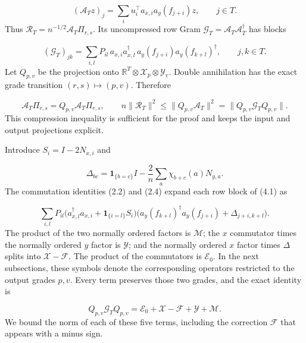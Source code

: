 \documentclass[11pt,a4paper]{article}
\begin{document}
\begin{equation*}
(\mathcal A_Tz)_j=\sum_i u_i^\top a_{x,i}a_y(f_{j+i})z,
\qquad j\in T.
\end{equation*}
Thus \(\mathcal R_T=n^{-1/2}\mathcal A_T\Pi_{r,s}\). Its uncompressed row Gram \(\mathcal G_T=\mathcal A_T\mathcal A_T^\dagger\) has blocks

\begin{equation}
(\mathcal G_T)_{jk}
=\sum_{i,l}P_{il}\,
a_{x,i}a_{x,l}^\dagger\,
a_y(f_{j+i})a_y(f_{k+l})^\dagger,
\qquad j,k\in T.
\tag{4.1}
\end{equation}
Let \(Q_{p,v}\) be the projection onto \(\mathbb R^T\otimes\mathcal X_p\otimes\mathcal Y_v\). Double annihilation has the exact grade transition \((r,s)\mapsto(p,v)\). Therefore

\begin{equation*}
\mathcal A_T\Pi_{r,s}=Q_{p,v}\mathcal A_T\Pi_{r,s},
\qquad
n\|\mathcal R_T\|^2
\le\|Q_{p,v}\mathcal A_T\|^2
=\|Q_{p,v}\mathcal G_TQ_{p,v}\|.
\end{equation*}
This compression inequality is sufficient for the proof and keeps the input and output projections explicit.

Introduce \(S_i=I-2N_{x,i}\) and

\begin{equation}
\Delta_{bc}=\mathbf1_{\{b=c\}}I-
\frac2n\sum_a\chi_{b+c}(a)N_{y,a}.
\tag{4.2}
\end{equation}
The commutation identities (2.2) and (2.4) expand each row block of (4.1) as

\begin{equation}
\sum_{i,l}P_{il}
\big(a_{x,l}^\dagger a_{x,i}+\mathbf1_{\{i=l\}}S_i\big)
\big(a_y(f_{k+l})^\dagger a_y(f_{j+i})+\Delta_{j+i,k+l}\big).
\tag{4.3}
\end{equation}
The product of the two normally ordered factors is \(\mathcal M\); the \(x\) commutator times the normally ordered \(y\) factor is \(\mathcal Y\); and the normally ordered \(x\) factor times \(\Delta\) splits into \(\mathcal X-\mathcal F\). The product of the commutators is \(\mathcal E_0\). In the next subsections, these symbols denote the corresponding operators restricted to the output grades \(p,v\). Every term preserves those two grades, and the exact identity is

\begin{equation}
Q_{p,v}\mathcal G_TQ_{p,v}
=\mathcal E_0+\mathcal X-\mathcal F+\mathcal Y+\mathcal M.
\tag{4.4}
\end{equation}
We bound the norm of each of these five terms, including the correction \(\mathcal F\) that appears with a minus sign.
\end{document}
